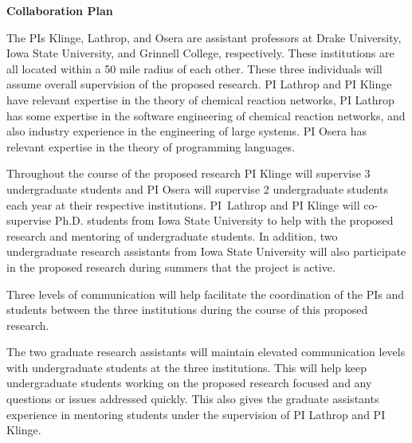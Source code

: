 \documentclass[11pt]{article}
\begin{document}
    \setcounter{page}{1}
    \begin{center}
        {\Large {\bf Collaboration Plan}}
    \end{center}

      The PIs Klinge, Lathrop, and Osera are assistant professors at Drake University, Iowa State University, and Grinnell College, respectively.
      These institutions are all located within a 50 mile radius of each other.
      These three individuals will assume overall supervision of the proposed research.
      PI Lathrop and PI Klinge have relevant expertise in the theory of chemical reaction networks, PI Lathrop has some expertise in the software engineering of chemical reaction networks, and also industry experience in the engineering of large systems.
      PI Osera has relevant expertise in the theory of programming languages.
    
      Throughout the course of the proposed research PI Klinge will supervise 3 undergraduate students and PI Osera will supervise 2 undergraduate students each year at their respective institutions.
      PI~Lathrop and PI Klinge will co-supervise Ph.D. students from Iowa State University to help with the proposed research and mentoring of undergraduate students.  In addition, two undergraduate research assistants from Iowa State University will also participate in the proposed research during summers that the project is active.
      
      Three levels of communication will help facilitate the coordination of the PIs and students between the three institutions during the course of this proposed research.
      
      
      The two graduate research assistants will maintain elevated communication levels with undergraduate students at the three institutions.
      This will help keep undergraduate students working on the proposed research focused and any questions or issues addressed quickly.
      This also gives the graduate assistants experience in mentoring students under the supervision of PI Lathrop and PI Klinge.
      
\end{document}
